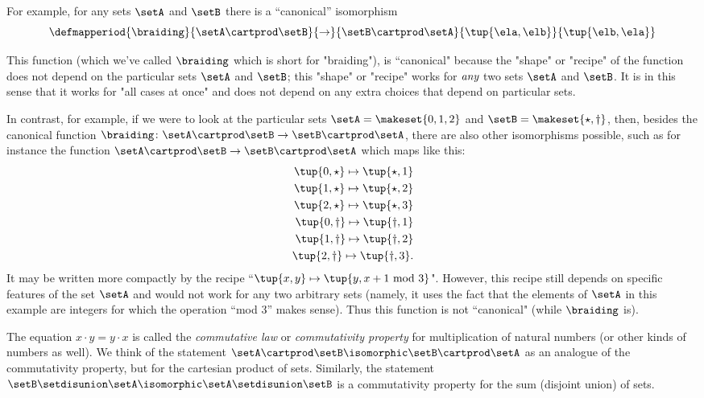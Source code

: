 For example, for any sets $\setA$ and $\setB$ there is a ``canonical'' isomorphism
 \begin{equation}
 \defmapperiod{
           \braiding
        }{
            \setA \cartprod \setB
        }{
            \to
        }{
            \setB \cartprod \setA
        }{
            \tup{\ela, \elb}
        }{
            \tup{\elb, \ela}
        }
\end{equation}

This function (which we've called $\braiding$ which is short for "braiding"), is ``canonical" because the "shape" or "recipe" of the function does not depend on the particular sets $\setA$ and $\setB$; this "shape" or "recipe" works for $\emph{any}$ two sets $\setA$ and $\setB$. It is in this sense that it works for "all cases at once" and does not depend on any extra choices that depend on particular sets.

In contrast, for example, if we were to look at the particular sets $\setA = \makeset{0, 1, 2}$ and $\setB = \makeset{\star, \dagger}$, then, besides the canonical function $\braiding \colon \setA \cartprod \setB \to \setB \cartprod \setA$, there are also other isomorphisms possible, such as for instance the function $\setA \cartprod \setB \to \setB \cartprod \setA$ which maps like this: 
\begin{align}
\tup{0, \star} \mapsto \tup{\star, 1} \\
\tup{1, \star} \mapsto \tup{\star, 2} \\
\tup{2, \star} \mapsto \tup{\star, 3} \\
\tup{0, \dagger} \mapsto \tup{\dagger, 1} \\
\tup{1, \dagger} \mapsto \tup{\dagger, 2} \\
\tup{2, \dagger} \mapsto \tup{\dagger, 3}.
\end{align}
It may be written more compactly by the recipe ``$\tup{x, y} \mapsto \tup{y, x +1 \text{ mod } 3}$". However, this recipe still depends on specific features of the  set $\setA$ and would not work for any two arbitrary sets (namely, it uses the fact that the elements of $\setA$ in this example are integers for which the operation ``mod 3'' makes sense). Thus this function is not ``canonical" (while $\braiding$ is). 

The equation $x \cdot y = y \cdot x$ is called the \emph{commutative law} or \emph{commutativity property} for multiplication of natural numbers (or other kinds of numbers as well). We think of the statement $\setA \cartprod \setB \isomorphic \setB \cartprod \setA$ as an analogue of the commutativity property, but for the cartesian product of sets. Similarly, the statement $\setB \setdisunion \setA \isomorphic \setA \setdisunion \setB$ is a commutativity property for the sum (disjoint union) of sets.

